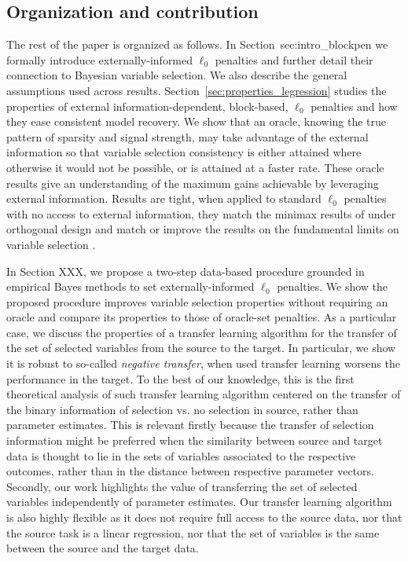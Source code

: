 \documentclass{article}
\begin{document}
\subsection{Organization and contribution}
The rest of the paper is organized as follows. In Section~{sec:intro_blockpen} we formally introduce externally-informed $\ell_0$ penalties and further detail their connection to Bayesian variable selection. We also describe the general assumptions used across results. Section~\ref{sec:properties_legression} studies the properties of external information-dependent, block-based, $\ell_0$ penalties and how they ease consistent model recovery. We show that an oracle, knowing the true pattern of sparsity and signal strength, may take advantage of the external information so that variable selection consistency is either attained where otherwise it would not be possible, or is attained at a faster rate. These oracle results give an understanding of the maximum gains achievable by leveraging external information. Results are tight, when applied to standard $\ell_0$ penalties with no access to external information, they match the minimax results of \cite{Bunea2007} under orthogonal design and match or improve the results on the fundamental limits on variable selection \cite{infotheowainwright, wang2010, bryon}. 

In Section XXX, we propose a two-step data-based procedure grounded in empirical Bayes methods to set externally-informed $\ell_0$ penalties. We show the proposed procedure improves variable selection properties without requiring an oracle and compare its properties to those of oracle-set penalties. As a particular case, we discuss the properties of a transfer learning algorithm for the transfer of the set of selected variables from the source to the target. In particular, we show it is robust to so-called \textit{negative transfer}, when used transfer learning worsens the performance in the target. To the best of our knowledge, this is the first theoretical analysis of such transfer learning algorithm centered on the transfer of the binary information of selection vs. no selection in source, rather than parameter estimates. This is relevant firstly because the transfer of selection information might be preferred when the similarity between source and target data is thought to lie in the sets of variables associated to the respective outcomes, rather than in the distance between respective parameter vectors. Secondly, our work highlights the value of transferring the set of selected variables independently of parameter estimates. Our transfer learning algorithm is also highly flexible as it does not require full access to the source data, nor that the source task is a linear regression, nor that the set of variables is the same between the source and the target data.
\end{document}
